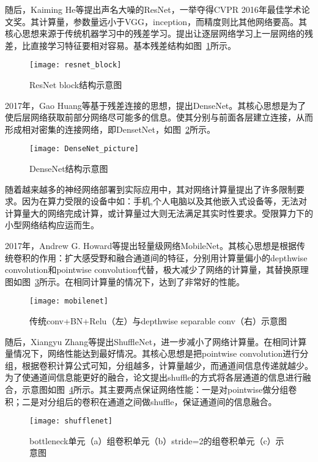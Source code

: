 随后，Kaiming He等提出声名大噪的ResNet，一举夺得CVPR 2016年最佳学术论文奖。其计算量，参数量远小于VGG，inception，而精度则比其他网络要高。其核心思想来源于传统机器学习中的残差学习。提出让逐层网络学习上一层网络的残差，比直接学习特征要相对容易。基本残差结构如图~\ref{fig:resnet_block}所示。

\begin{figure}[htp]
\centering
\texttt{[image: resnet\_block]}
\caption{ResNet block结构示意图}
\label{fig:resnet_block}
\end{figure}
2017年，Gao Huang等基于残差连接的思想，提出DenseNet。其核心思想是为了使后层网络获取前部分网络尽可能多的信息。使其分别与前面各层建立连接，从而形成相对密集的连接网络，即DensetNet，如图~\ref{fig:DenseNet_picture}所示。

\begin{figure}[htp]
\centering
\texttt{[image: DenseNet\_picture]}
\caption{DenseNet结构示意图}
\label{fig:DenseNet_picture}
\end{figure}
随着越来越多的神经网络部署到实际应用中，其对网络计算量提出了许多限制要求。因为在算力受限的设备中如：手机,个人电脑以及其他嵌入式设备等，无法对计算量大的网络完成计算，或计算量过大则无法满足其实时性要求。受限算力下的小型网络结构应运而生。

2017年，Andrew G. Howard等提出轻量级网络MobileNet。其核心思想是根据传统卷积的作用：扩大感受野和融合通道间的特征，分别用计算量偏小的depthwise convolution和pointwise convolution代替，极大减少了网络的计算量，其替换原理图如图~\ref{fig:mobilenet}所示。在相同计算量的情况下，达到了非常好的性能。

\begin{figure}[htp]
\centering
\texttt{[image: mobilenet]}
\caption{传统conv+BN+Relu（左）与depthwise separable conv（右）示意图}
\label{fig:mobilenet}
\end{figure}
随后，Xiangyu Zhang等提出ShuffleNet，进一步减小了网络计算量。在相同计算量情况下，网络性能达到最好情况。其核心思想是把pointwise convolution进行分组，根据卷积计算公式可知，分组越多，计算量越少，而通道间信息传递就越少。为了使通道间信息能更好的融合，论文提出shuffle的方式将各层通道的信息进行融合，示意图如图~\ref{fig:shufflenet}所示。其主要两点保证网络性能：一是对pointwise做分组卷积；二是对分组后的卷积在通道之间做shuffle，保证通道间的信息融合。

\begin{figure}[htp]
\centering
\texttt{[image: shufflenet]}
\caption{bottleneck单元（a）组卷积单元（b）stride=2的组卷积单元（c）示意图}
\label{fig:shufflenet}
\end{figure}
